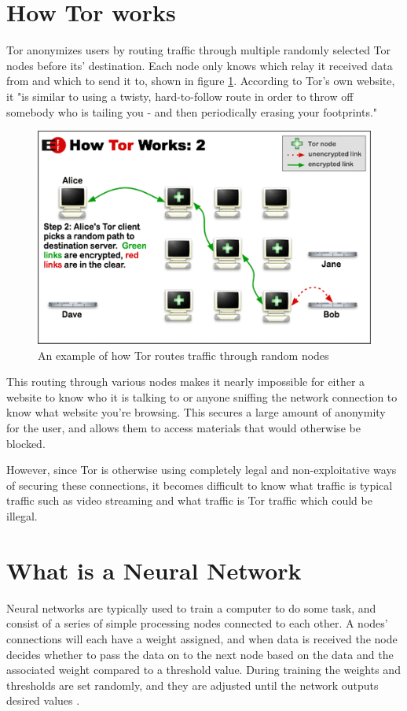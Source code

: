 \documentclass[conference,12pt]{IEEEtran}
\begin{document}
\section{How Tor works}
Tor anonymizes users by routing traffic through multiple randomly selected Tor nodes before its' destination.  Each node only knows which relay it received data from and which to send it to, shown in figure \ref{fig:how-tor-works}.  According to Tor's own website, it "is similar to using a twisty, hard-to-follow route in order to throw off somebody who is tailing you - and then periodically erasing your footprints." \parencite{cite:Tor-Overview}

\begin{figure}[H]
    \centering
    \includegraphics[scale=0.45]{Explanations/How-Tor-Works.png}
    \caption{An example of how Tor routes traffic through random nodes \parencite{cite:Tor-Overview}}
    \label{fig:how-tor-works}
\end{figure}

This routing through various nodes makes it nearly impossible for either a website to know who it is talking to or anyone sniffing the network connection to know what website you're browsing. This secures a large amount of anonymity for the user, and allows them to access materials that would otherwise be blocked.

However, since Tor is otherwise using completely legal and non-exploitative ways of securing these connections, it becomes difficult to know what traffic is typical traffic such as video streaming and what traffic is Tor traffic which could be illegal. 

\section{What is a Neural Network}
Neural networks are typically used to train a computer to do some task, and consist of a series of simple processing nodes connected to each other.  A nodes' connections will each have a weight assigned, and when data is received the node decides whether to pass the data on to the next node based on the data and the associated weight compared to a threshold value.  During training the weights and thresholds are set randomly, and they are adjusted until the network outputs desired values \parencite{cite:Explained-Neural-Networks}.
\end{document}
